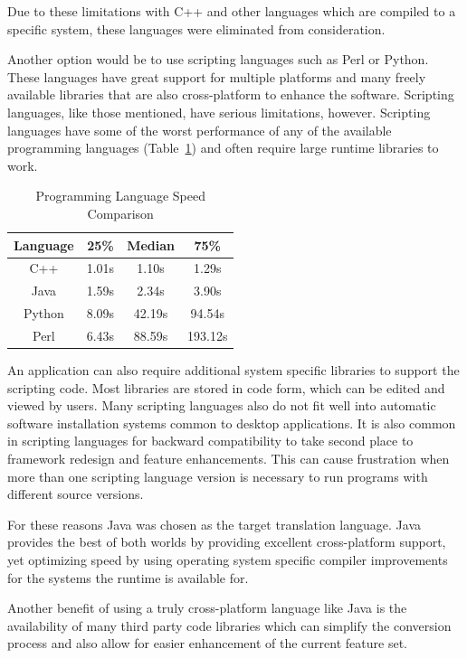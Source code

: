 \documentclass[project]{bsu-ms}
\begin{document}
Due to these limitations with C++ and other languages which are compiled to a specific system, these languages were eliminated from consideration. 

Another option would be to use scripting languages such as Perl or Python. These languages have great support for multiple platforms and many freely available libraries that are also cross-platform to enhance the software\cite{band:web4}. Scripting languages, like those mentioned, have serious limitations, however. Scripting languages have some of the worst performance of any of the available programming languages (Table~\ref{tbl:speed}) and often require large runtime libraries to work. 

\begin{table}[h]
\caption{Programming Language Speed Comparison \cite{band:web5}}
\label{tbl:speed}
\centering
\begin{tabular}{|c|c|c|c|}\hline \hline
Language  &25\%  &Median &75\%\\ \hline
C++          &1.01s  &1.10s   &1.29s\\ \hline
Java          &1.59s  &2.34s   &3.90s\\ \hline
Python      &8.09s  &42.19s   &94.54s\\ \hline
Perl           &6.43s  &88.59s   &193.12s\\ \hline
\end{tabular}
\end{table}

An application can also require additional system specific libraries to support the scripting code. Most libraries are stored in code form, which can be edited and viewed by users. Many scripting languages also do not fit well into automatic software installation systems common to desktop applications. It is also common in scripting languages for backward compatibility to take second place to framework redesign and feature enhancements. This can cause frustration when more than one scripting language version is necessary to run programs with different source versions.

For these reasons Java was chosen as the target translation language. Java provides the best of both worlds by providing excellent cross-platform support, yet optimizing speed by using operating system specific compiler improvements for the systems the runtime is available for. 

Another benefit of using a truly cross-platform language like Java is the availability of many third party code libraries which can simplify the conversion process and also allow for easier enhancement of the current feature set.
\end{document}
